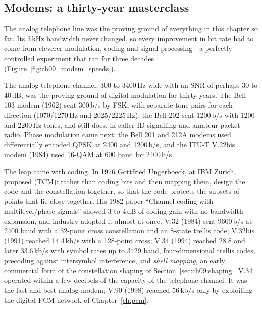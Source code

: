 \subsection{Modems: a thirty-year masterclass}

The analog telephone line was the proving ground of everything in this chapter so far. Its 3\,kHz
bandwidth never changed, so every improvement in bit rate had to come from cleverer modulation,
coding and signal processing---a perfectly controlled experiment that ran for three decades
(Figure~\ref{fig:ch09_modem_speeds}).


\begin{history}
The analog telephone channel, 300 to 3400\,Hz wide with an SNR of perhaps 30 to 40\,dB, was the
proving ground of digital modulation for thirty years. The Bell 103 modem (1962) sent 300\,b/s by
FSK, with separate tone pairs for each direction (1070/1270\,Hz and 2025/2225\,Hz); the Bell 202
sent 1200\,b/s with 1200 and 2200\,Hz tones, and still does, in caller-ID signalling and amateur
packet radio. Phase modulation came next: the Bell 201 and 212A modems used differentially
encoded QPSK at 2400 and 1200\,b/s, and the ITU-T V.22bis modem (1984) used 16-QAM at 600 baud
for 2400\,b/s.

The leap came with coding. In 1976 Gottfried Ungerboeck, at IBM Z\"urich, proposed
 (TCM): rather than coding bits and then mapping them, design the
code and the constellation together, so that the code protects the subsets of points that lie
close together. His 1982 paper ``Channel coding with multilevel/phase signals'' showed 3 to
4\,dB of coding gain with no bandwidth expansion, and industry adopted it almost at once. V.32
(1984) sent 9600\,b/s at 2400 baud with a 32-point cross constellation and an 8-state trellis
code; V.32bis (1991) reached 14.4\,kb/s with a 128-point cross; V.34 (1994) reached 28.8 and later
33.6\,kb/s with symbol rates up to 3429 baud, four-dimensional trellis codes, precoding against
intersymbol interference, and \emph{shell mapping}, an early commercial form of the constellation
shaping of Section~\ref{sec:ch09:shaping}. V.34 operated within a few decibels of the capacity of
the telephone channel. It was the last and best analog modem; V.90 (1998) reached 56\,kb/s only by
exploiting the digital PCM network of Chapter~\ref{ch:pcm}.
\end{history}

